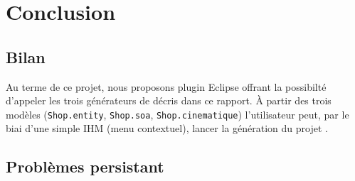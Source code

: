 \chapter{Conclusion}\label{chap:COnc}



\section{Bilan}
Au terme de ce projet, nous proposons plugin Eclipse offrant la possibilté d'appeler les trois générateurs de décris dans ce rapport. À partir des trois modèles (\verb+Shop.entity+, \verb+Shop.soa+, \verb+Shop.cinematique+) l'utilisateur peut, par le biai d'une simple IHM (menu contextuel), lancer la génération du projet \kwplay{}. 




\section{Problèmes persistant}



